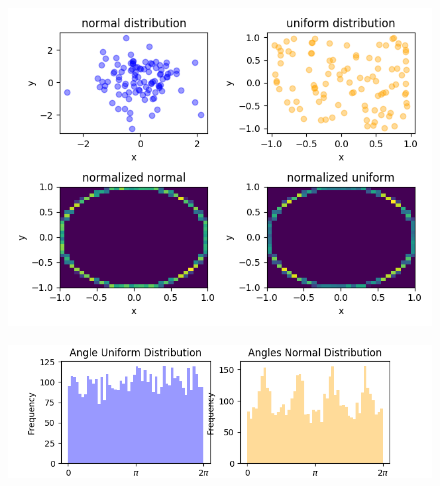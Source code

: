 \begin{figure}[ht]
\begin{center}
\includegraphics[width=15.0cm]{styles/distributions} \label{plot:distributions}
  \caption{}
  \includegraphics[width=15.0cm]{styles/histograms} \label{plot:historam}
    \caption{}
\end{center}
\end{figure}



